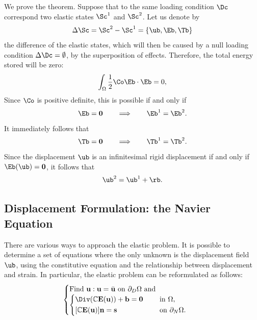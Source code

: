 We prove the theorem. Suppose that to the same loading condition $\Dc$ correspond two elastic states $\Sc^1$ and $\Sc^2$. Let us denote by
\begin{equation}
	\Delta \Sc=\Sc^2-\Sc^1=\{\ub, \Eb, \Tb\}
\end{equation}
the difference of the elastic states, which will then be caused by a null loading condition $\Delta\Dc=\emptyset$, by the superposition of effects. Therefore, the total energy 
stored will be zero:
\begin{equation}
	\int_{\Omega}\frac{1}{2}\Co \Eb \cdot \Eb=0,
\end{equation}
Since $\Co$ is positive definite, this is possible if and only if 
\begin{equation}
	\Eb=\mathbf{0}  \qquad \Longrightarrow\qquad \Eb^1=\Eb^2.
\end{equation}
It immediately follows that 
\begin{equation}
	\Tb=\mathbf{0} \qquad \Longrightarrow\qquad \Tb^1=\Tb^2.
\end{equation}
Since the displacement $\ub$ is an infinitesimal rigid displacement if and only if $\Eb(\ub)=\mathbf{0}$, it follows that
\begin{equation}
	\ub^2=\ub^1+\rb.
\end{equation}



\subsection{Displacement Formulation: the Navier Equation}
There are various ways to approach the elastic problem. It is possible to determine a set of equations where the only unknown is the displacement field $\ub$, using the constitutive equation and the relationship between displacement and strain. In particular, the elastic problem can be reformulated as follows:
\begin{equation}
	\begin{cases}
		\mathrm{Find~}\mathbf{u}:\mathbf{u}=\bar{\mathbf{u}}\mathrm{~on~}\partial_D\Omega\mathrm{~and}\\
		\begin{cases}
			\begin{aligned}
				&\Div(\mathbb{C}\mathbf{E}(\mathbf{u}))+\mathbf{b}=\mathbf{0}  \quad &&\mathrm{~in~}\Omega,\\
				&[\mathbb{C}\mathbf{E}(\mathbf{u})]\mathbf{n}=\mathbf{s} &&\mathrm{~on~}\partial_N\Omega.
			\end{aligned}
		\end{cases}
	\end{cases}
\end{equation}

